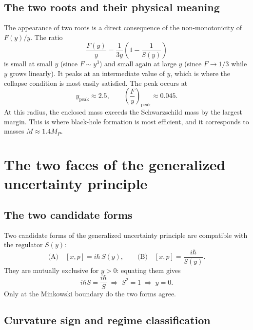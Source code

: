 \documentclass[12pt,oneside,openany]{book}
\begin{document}
\subsection{The two roots and their physical meaning}

The appearance of two roots is a direct consequence of the
non-monotonicity of $F(y)/y$. The ratio
\begin{equation}
\frac{F(y)}{y}
=
\frac{1}{3y}\left(1-\frac{1}{S(y)}\right)
\label{eq:F-over-y}
\end{equation}
is small at small $y$ (since $F\sim y^{3}$) and small again at
large $y$ (since $F\to 1/3$ while $y$ grows linearly). It peaks
at an intermediate value of $y$, which is where the collapse
condition is most easily satisfied. The peak occurs at
\begin{equation}
y_{\text{peak}}\approx 2.5,
\qquad
\left(\frac{F}{y}\right)_{\text{peak}}\approx 0.045.
\label{eq:peak}
\end{equation}
At this radius, the enclosed mass exceeds the Schwarzschild
mass by the largest margin. This is where black-hole formation
is most efficient, and it corresponds to masses
$M\approx 1.4 M_{P}$.

\section{The two faces of the generalized uncertainty principle}

\subsection{The two candidate forms}

Two candidate forms of the generalized uncertainty principle
are compatible with the regulator $S(y)$:
\begin{equation}
\text{(A)}\quad [x,p]=i\hbar\,S(y),
\qquad
\text{(B)}\quad [x,p]=\frac{i\hbar}{S(y)}.
\label{eq:AB}
\end{equation}
They are mutually exclusive for $y>0$: equating them gives
\begin{equation}
i\hbar S=\frac{i\hbar}{S}
\;\Longrightarrow\;
S^{2}=1
\;\Longrightarrow\;
y=0.
\label{eq:exclusive}
\end{equation}
Only at the Minkowski boundary do the two forms agree.

\subsection{Curvature sign and regime classification}
\end{document}
